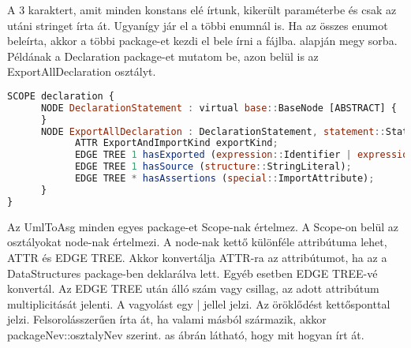 A 3 karaktert, amit minden konstans elé írtunk, kikerült paraméterbe és csak az utáni stringet írta át.
Ugyanígy jár el a többi enumnál is.
Ha az összes enumot beleírta, akkor a többi package-et kezdi el bele írni a fájlba.  alapján megy sorba.
Példának a Declaration package-et mutatom be, azon belül is az ExportAllDeclaration osztályt.

\begin{lstlisting}[caption={Asg fájl ExportAllDeclaration},label={lst:asg_file_export_all_declaration}, language={JavaScript}]
SCOPE declaration {
      NODE DeclarationStatement : virtual base::BaseNode [ABSTRACT] {
      }
      NODE ExportAllDeclaration : DeclarationStatement, statement::Statement, virtual statement::ProgramStatement, special::Node {
            ATTR ExportAndImportKind exportKind;
            EDGE TREE 1 hasExported (expression::Identifier | expression::LiteralExpression);
            EDGE TREE 1 hasSource (structure::StringLiteral);
            EDGE TREE * hasAssertions (special::ImportAttribute);
      }
}
\end{lstlisting}

Az UmlToAsg minden egyes package-et Scope-nak értelmez.
A Scope-on belül az osztályokat node-nak értelmezi.
A node-nak kettő különféle attribútuma lehet, ATTR és EDGE TREE.
Akkor konvertálja ATTR-ra az attribútumot, ha az a DataStructures package-ben deklarálva lett. Egyéb esetben EDGE TREE-vé konvertál.
Az EDGE TREE után álló szám vagy csillag, az adott attribútum multiplicitását jelenti.
A vagyolást egy | jellel jelzi.
Az öröklődést kettősponttal jelzi.
Felsorolásszerűen írta át, ha valami másból származik, akkor packageNev::osztalyNev szerint.
as ábrán látható, hogy mit hogyan írt át.


